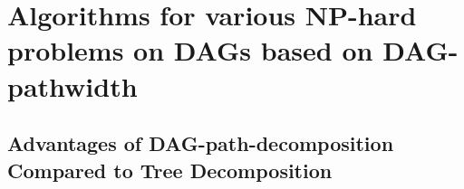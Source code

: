 \documentclass[runningheads]{llncs}
\theoremstyle{plain}
\theoremstyle{definition}
\begin{document}
\begin{comment}
    The pebbling number of $G$ $(\mathsf{Peb}(G))$ is the minimum $space$ over all strategies of $G$.
\end{definition}

For general DAGs, the problem of computing the pebbling number is PSPACE-complete [\cite{art14}]. The Black Pebbling game is used in blockchain technology known as Proof of Space [\cite{art15}]. Proof of Space is a method to prove the amount of free disk space held, where the input DAG corresponds to the free disk space. Moreover, the pebbling number corresponds to the amount of memory used simultaneously. A larger pebbling number indicates greater memory or data usage, making the proof more challenging and thus indicating higher security of the proof.

Additionally, the one-shot Black Pebbling (one-shot BP) is defined by adding the following rule to the Black Pebbling game:

\begin{description}
    \item[Rule 5] Each vertex of the DAG $G$ is pebbled only once.
\end{description}

The pebbling number for one-shot BP can also be defined similarly. For general DAGs, the problem of computing the pebbling number for one-shot BP is NP-hard [\cite{art16}]. In Section 4.3, we demonstrate that one-shot BP is equivalent to the problem of constructing a nice DAG-path-decomposition on DAGs.
\end{comment}






















\section{Algorithms for various NP-hard problems on DAGs based on DAG-pathwidth}

\subsection{Advantages of DAG-path-decomposition Compared to Tree Decomposition}
\end{document}
